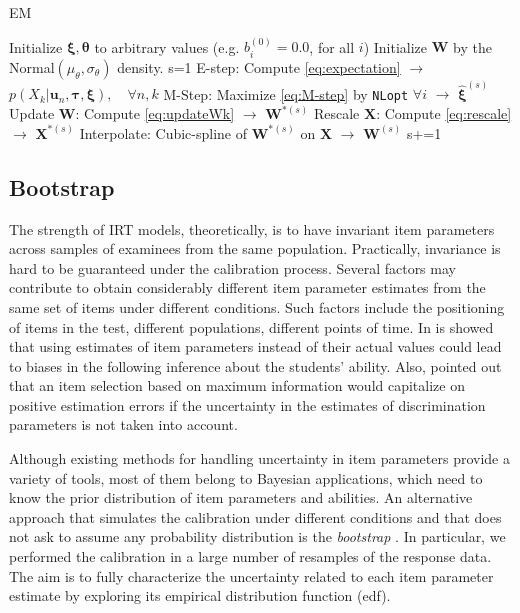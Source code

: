 \begin{algorithm}[H]
	\caption{EM}\label{alg:EMalg}
	\begin{algorithmic}
		\State Initialize $\boldsymbol{\xi},\boldsymbol\theta$ to arbitrary values (e.g. $b^{(0)}_i=0.0$, for all $i$)
		\State Initialize $\boldsymbol{W}$ by the Normal$(\mu_{\theta},\sigma_\theta)$ density.
		\State s=1
		\State E-step: Compute \eqref{eq:expectation} $\rightarrow$ $p(X_k|\mathbf{u}_n,\boldsymbol{\tau},\boldsymbol{\xi}), \quad \forall n,k$
		\State M-Step: Maximize \eqref{eq:M-step} by \texttt{NLopt} $\forall i$ $\rightarrow$ $ \hat{\boldsymbol{\xi}}^{(s)}$
		\State Update $\boldsymbol{W}$: Compute \eqref{eq:updateWk} $\rightarrow$ $\boldsymbol{W}^{*(s)}$
		\State Rescale $\boldsymbol{X}$: Compute \eqref{eq:rescale} $\rightarrow$ $\boldsymbol{X}^{*(s)}$
		\EndIf
		\State Interpolate: Cubic-spline of $\boldsymbol{W}^{*(s)}$ on  $\boldsymbol{X}$ $\rightarrow$ $\boldsymbol{W}^{(s)}$
		\State s+=1 
		\EndWhile
	\end{algorithmic}
\end{algorithm}

\subsection{Bootstrap}\label{sec:juliaBS}

The strength of IRT models, theoretically, is to have invariant item parameters across samples of examinees from the same population. Practically, invariance is hard to be guaranteed under the calibration process. 
Several factors may contribute to obtain considerably different item parameter estimates from the same set of items under different conditions. Such factors include the positioning of items in the test, different populations, different points of time. In \textcite{tsutakawa1990effect} is showed that using estimates of item parameters instead of their actual values could lead to biases in the following inference about the students' ability. Also, \textcite{veldkamp2013application} pointed out that an item selection based on maximum information would capitalize on positive estimation errors if the uncertainty in the estimates of discrimination parameters is not taken into account. 

Although existing methods for handling uncertainty in item parameters provide a variety of tools, most of them belong to Bayesian applications, which need to know the prior distribution of item parameters and abilities. An alternative approach that simulates the calibration under different conditions and that does not ask to assume any probability distribution is the \emph{bootstrap} \parencite[see][]{efron1993}. In particular, we performed the calibration in a large number of resamples of the response data. The aim is to fully characterize the uncertainty related to each item parameter estimate by exploring its empirical distribution function (edf). 

